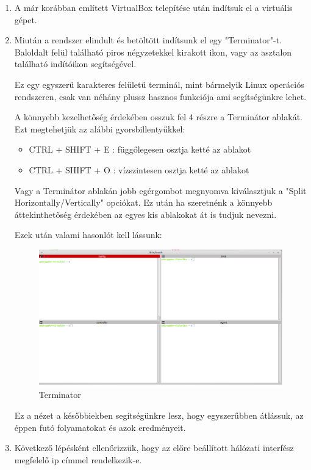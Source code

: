 \documentclass[a4paper,12pt,oneside]{report}
\begin{document}
\begin{enumerate}
\item A már korábban említett VirtualBox \cite{website:vbox} telepítése után indítsuk el a virtuális gépet.
\item  Miután a rendszer elindult és betöltött indítsunk el egy "Terminator"-t. Baloldalt felül található piros négyzetekkel kirakott ikon, vagy az asztalon található indítóikon segítségével.

Ez egy egyszerű karakteres felületű terminál, mint bármelyik Linux operációs rendszeren, csak van néhány plussz hasznos funkciója ami segítségünkre lehet.

A könnyebb kezelhetőség érdekében osszuk fel 4 részre a Terminátor ablakát.
Ezt megtehetjük az alábbi gyorsbillentyűkkel:
\begin{itemize}
\itemsep0em
\item CTRL + SHIFT + E : függőlegesen osztja ketté az ablakot
\item CTRL + SHIFT + O : vízszintesen osztja ketté az ablakot
\end{itemize}
Vagy a Terminátor ablakán jobb egérgombot megnyomva kiválasztjuk a "Split Horizontally/Vertically" opciókat. Ez után ha szeretnénk a könnyebb áttekinthetőség érdekében az egyes kis ablakokat át is tudjuk nevezni.

Ezek után valami hasonlót kell lássunk:
\begin{figure}[h]
      \includegraphics[width=1\textwidth,keepaspectratio]{1.png}
          \caption{Terminator}
      \label{fig:terminator}
\end{figure}

Ez a nézet a későbbiekben segítségünkre lesz, hogy egyszerűbben átlássuk, az éppen futó folyamatokat és azok eredményeit.

\item Következő lépésként ellenőrizzük, hogy az előre beállított hálózati interfész megfelelő ip címmel rendelkezik-e.


\end{enumerate}
\end{document}
